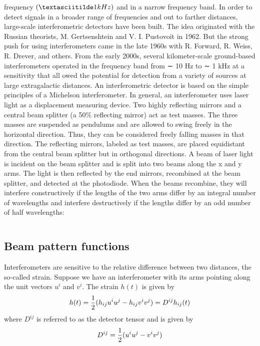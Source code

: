\documentclass[binding=0.6cm, LaM]{sapthesis}
\begin{document}
 frequency $(\textasciitilde 1 kHz)$ and in a narrow frequency band. In order to detect signals in a broader range of frequencies and out to farther distances, large-scale interferometric detectors
 have been built. The idea originated with the Russian theorists, M. Gertsenshtein and V. I. Pustovoit in 1962. But the strong push for using interferometers came in the late 1960s with 
R. Forward, R. Weiss, R. Drever, and others. From the early 2000s, several kilometer-scale ground-based interferometers operated in the frequency band from ∼ 10 Hz to ∼ 1 kHz at a sensitivity that all
owed the potential for detection from a variety of sources at large extragalactic distances.
An interferometric detector is based on the simple principles of a Michelson interferometer. In general, an interferometer uses laser light as a displacement measuring device. 
Two highly reflecting mirrors and a central beam splitter (a 50\% reflecting mirror) act as test masses. The three masses are suspended as pendulums and are allowed to swing freely in the horizontal
 direction. Thus, they can be considered freely falling masses in that direction. The reflecting mirrors,  labeled as test masses, are placed equidistant from the central beam splitter but in 
orthogonal directions.
A beam of laser light is incident on the beam splitter and is split into two beams along the x and y arms. The light is then reflected by the end mirrors, recombined at the beam splitter,
 and detected at the photodiode. When the beams recombine, they will interfere constructively if the lengths of the two arms differ by an integral number of wavelengths and interfere destructively 
if the lengths differ by an odd number of half wavelengths:

\begin{equation}

\end{equation}
\subsection{Beam pattern functions}

Interferometers are sensitive to the relative difference between two distances, the so-called strain.
 Suppose we have an interferometer with its arms pointing along the unit vectors $u^i$ and $v^i$. The strain $h(t)$ is given by
\begin{equation}
h(t) = {1 \over 2} (h_{ij}u^iu^j - h_{ij}v^iv^j) = D^{ij}h_{ij}(t)
\end{equation}
where $D^{ij}$ is referred to as the detector tensor and is given by
\begin{equation}
D^{ij} = {1\over 2} (u^iu^j -v^iv^j)
\end{equation}
\end{document}
